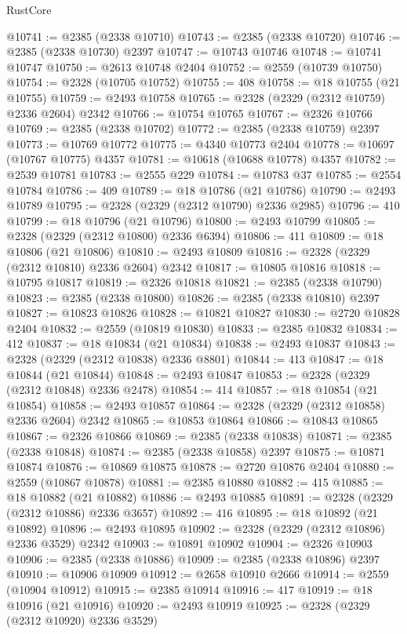 \begin{lexlean}{RustCore}
\begin{coremodule}
@10741 := @2385 (@2338 @10710)
@10743 := @2385 (@2338 @10720)
@10746 := @2385 (@2338 @10730) @2397
@10747 := @10743 @10746
@10748 := @10741 @10747
@10750 := @2613 @10748 @2404
@10752 := @2559 (@10739 @10750)
@10754 := @2328 (@10705 @10752)
@10755 := 408
@10758 := @18 @10755 (@21 @10755)
@10759 := @2493 @10758
@10765 := @2328 (@2329 (@2312 @10759) @2336 @2604) @2342
@10766 := @10754 @10765
@10767 := @2326 @10766
@10769 := @2385 (@2338 @10702)
@10772 := @2385 (@2338 @10759) @2397
@10773 := @10769 @10772
@10775 := @4340 @10773 @2404
@10778 := @10697 (@10767 @10775) @4357
@10781 := @10618 (@10688 @10778) @4357
@10782 := @2539 @10781
@10783 := @2555 @229
@10784 := @10783 @37
@10785 := @2554 @10784
@10786 := 409
@10789 := @18 @10786 (@21 @10786)
@10790 := @2493 @10789
@10795 := @2328 (@2329 (@2312 @10790) @2336 @2985)
@10796 := 410
@10799 := @18 @10796 (@21 @10796)
@10800 := @2493 @10799
@10805 := @2328 (@2329 (@2312 @10800) @2336 @6394)
@10806 := 411
@10809 := @18 @10806 (@21 @10806)
@10810 := @2493 @10809
@10816 := @2328 (@2329 (@2312 @10810) @2336 @2604) @2342
@10817 := @10805 @10816
@10818 := @10795 @10817
@10819 := @2326 @10818
@10821 := @2385 (@2338 @10790)
@10823 := @2385 (@2338 @10800)
@10826 := @2385 (@2338 @10810) @2397
@10827 := @10823 @10826
@10828 := @10821 @10827
@10830 := @2720 @10828 @2404
@10832 := @2559 (@10819 @10830)
@10833 := @2385 @10832
@10834 := 412
@10837 := @18 @10834 (@21 @10834)
@10838 := @2493 @10837
@10843 := @2328 (@2329 (@2312 @10838) @2336 @8801)
@10844 := 413
@10847 := @18 @10844 (@21 @10844)
@10848 := @2493 @10847
@10853 := @2328 (@2329 (@2312 @10848) @2336 @2478)
@10854 := 414
@10857 := @18 @10854 (@21 @10854)
@10858 := @2493 @10857
@10864 := @2328 (@2329 (@2312 @10858) @2336 @2604) @2342
@10865 := @10853 @10864
@10866 := @10843 @10865
@10867 := @2326 @10866
@10869 := @2385 (@2338 @10838)
@10871 := @2385 (@2338 @10848)
@10874 := @2385 (@2338 @10858) @2397
@10875 := @10871 @10874
@10876 := @10869 @10875
@10878 := @2720 @10876 @2404
@10880 := @2559 (@10867 @10878)
@10881 := @2385 @10880
@10882 := 415
@10885 := @18 @10882 (@21 @10882)
@10886 := @2493 @10885
@10891 := @2328 (@2329 (@2312 @10886) @2336 @3657)
@10892 := 416
@10895 := @18 @10892 (@21 @10892)
@10896 := @2493 @10895
@10902 := @2328 (@2329 (@2312 @10896) @2336 @3529) @2342
@10903 := @10891 @10902
@10904 := @2326 @10903
@10906 := @2385 (@2338 @10886)
@10909 := @2385 (@2338 @10896) @2397
@10910 := @10906 @10909
@10912 := @2658 @10910 @2666
@10914 := @2559 (@10904 @10912)
@10915 := @2385 @10914
@10916 := 417
@10919 := @18 @10916 (@21 @10916)
@10920 := @2493 @10919
@10925 := @2328 (@2329 (@2312 @10920) @2336 @3529)

\end{coremodule}
\end{lexlean}
